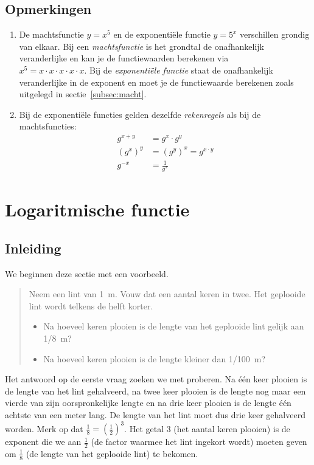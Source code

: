 \subsection{Opmerkingen}
 \begin{enumerate}
     \item  De machtsfunctie $y=x^{5}$ en de exponenti\"{e}le functie
     $y=5^{x}$ verschillen grondig van elkaar. Bij een \emph{machtsfunctie}
     is het grondtal de onafhankelijk veranderlijke en kan je de
     functiewaarden berekenen via \\$x^{5}=x\cdot x\cdot x\cdot x\cdot x$. Bij de
     \emph{exponenti\"{e}le functie} staat de onafhankelijk veranderlijke in
     de exponent en moet je de functiewaarde berekenen zoals uitgelegd in sectie~\ref{subsec:macht}.

     \item  Bij de exponenti\"{e}le functies gelden dezelfde
     \emph{rekenregels} als bij de machtsfuncties:
     \begin{align*}
       g^{x+y} & =g^{x}\cdot g^{y} \\
       \left(g^{x}\right)^{y} & =\left(g^{y}\right)^{x}=g^{x\cdot y} \\
       g^{-x} & =\frac{1}{g^{x}}
     \end{align*}
 \end{enumerate}



\section{Logaritmische functie}
\subsection{Inleiding}
We beginnen deze sectie met een voorbeeld. 
\begin{quote}
Neem een lint van \SI{1}{\meter}. Vouw dat een aantal keren in twee. Het geplooide
lint wordt telkens de helft korter.
\begin{itemize}
    \item  Na hoeveel keren plooien is de lengte van het geplooide lint gelijk aan \SI{1/8}{\meter}?

    \item  Na hoeveel keren plooien is de lengte kleiner dan \SI{1/100}{\meter}?
\end{itemize}
\end{quote}
Het antwoord op de eerste vraag zoeken we met proberen. Na \'e\'en keer plooien is de lengte van het lint gehalveerd, na twee keer plooien is de lengte nog maar een vierde van zijn oorspronkelijke lengte en na drie keer plooien is de lengte \'e\'en achtste van een meter lang. De lengte van het lint moet dus drie keer gehalveerd worden.  Merk op dat  $\frac18=\left(\frac12\right)^3$. Het getal 3 (het aantal keren plooien) is de exponent die we aan $\frac12$ (de factor waarmee het lint ingekort wordt) moeten geven om $\frac18$ (de lengte van het geplooide lint) te bekomen.

